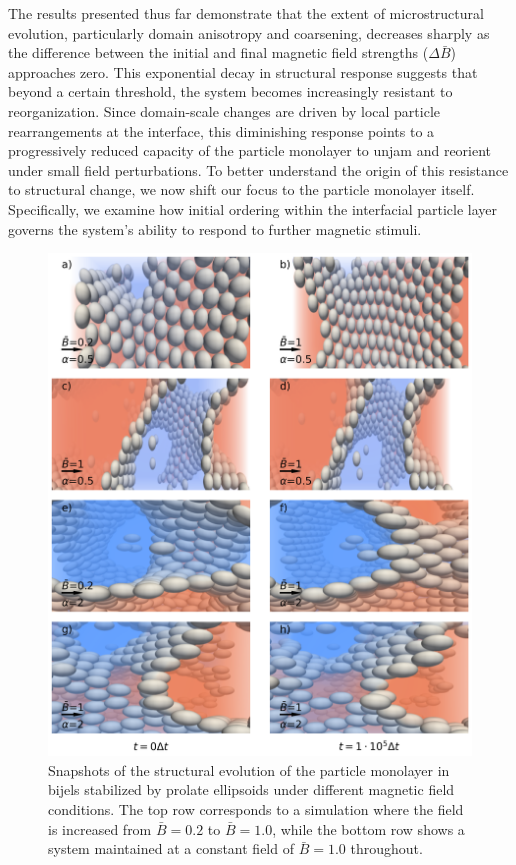 The results presented thus far demonstrate that the extent of microstructural evolution, particularly domain anisotropy and coarsening, decreases sharply 
as the difference between the initial and final magnetic field strengths (\(\Delta \bar{B}\)) approaches zero. This exponential decay in structural 
response suggests that beyond a certain threshold, the system becomes increasingly resistant to reorganization. Since domain-scale changes are driven 
by local particle rearrangements at the interface, this diminishing response points to a progressively reduced capacity of the particle monolayer to 
unjam and reorient under small field perturbations. To better understand the origin of this resistance to structural change, we now shift our focus to 
the particle monolayer itself. Specifically, we examine how initial ordering within the interfacial particle layer governs the system's ability to respond 
to further magnetic stimuli.

\begin{figure} 
\centering 
\includegraphics[scale=0.5]{../figures/results/paper2/particle_viz-field_up.png} 
\caption{Snapshots of the structural evolution of the particle monolayer in bijels stabilized by prolate ellipsoids 
         under different magnetic field conditions. The top row corresponds to a simulation where the field is increased from 
         \(\bar{B} = 0.2\) to \(\bar{B} = 1.0\), while the bottom row shows a system maintained at a constant field of \(\bar{B} = 1.0\) throughout.} 
\label{fig:particle_viz-field_up} 
\end{figure}

